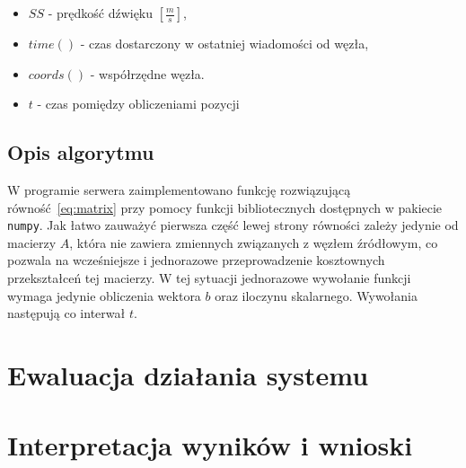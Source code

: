 \begin{itemize}
    \item $SS$ {-} prędkość dźwięku $\left[\frac{m}{s}\right]$,
    \item $time()$ {-} czas dostarczony w ostatniej wiadomości od węzła,
    \item $coords()$ {-} współrzędne węzła.
    \item $t$ {-} czas pomiędzy obliczeniami pozycji
\end{itemize}

\subsection{Opis algorytmu}

W programie serwera zaimplementowano funkcję rozwiązującą równość~\ref{eq:matrix} przy pomocy funkcji bibliotecznych dostępnych w pakiecie \texttt{numpy}. Jak łatwo zauważyć pierwsza część lewej strony równości zależy jedynie od macierzy $A$, która nie zawiera zmiennych związanych z węzłem źródłowym, co pozwala na wcześniejsze i jednorazowe przeprowadzenie kosztownych przekształceń tej macierzy. W tej sytuacji jednorazowe wywołanie funkcji wymaga jedynie obliczenia wektora $b$ oraz iloczynu skalarnego. Wywołania następują co interwał $t$.

\section{Ewaluacja działania systemu}

\section{Interpretacja wyników i wnioski}
